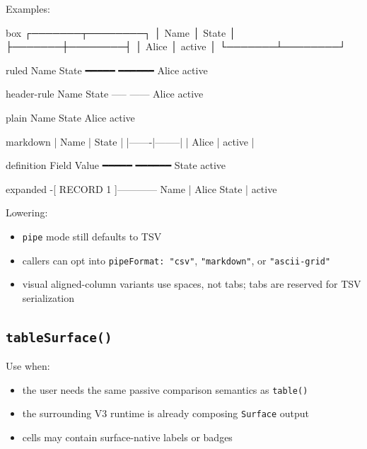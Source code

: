 Examples:

\begin{CodeBlock}
box
┌───────┬────────┐
│ Name  │ State  │
├───────┼────────┤
│ Alice │ active │
└───────┴────────┘

ruled
Name   State
━━━━━  ━━━━━━
Alice  active

header-rule
Name   State
-----  ------
Alice  active

plain
Name   State
Alice  active

markdown
| Name  | State  |
|-------|--------|
| Alice | active |

definition
Field  Value
━━━━━  ━━━━━━
State  active

expanded
-[ RECORD 1 ]------------
Name  | Alice
State | active
\end{CodeBlock}

Lowering:

\begin{itemize}
\tightlist
\item
  \texttt{p\allowbreak{}i\allowbreak{}p\allowbreak{}e} mode still defaults to TSV
\item
  callers can opt into \texttt{p\allowbreak{}i\allowbreak{}p\allowbreak{}e\allowbreak{}F\allowbreak{}o\allowbreak{}r\allowbreak{}m\allowbreak{}a\allowbreak{}t\allowbreak{}:\allowbreak{} \allowbreak{}"\allowbreak{}c\allowbreak{}s\allowbreak{}v\allowbreak{}"}, \texttt{"\allowbreak{}m\allowbreak{}a\allowbreak{}r\allowbreak{}k\allowbreak{}d\allowbreak{}o\allowbreak{}w\allowbreak{}n\allowbreak{}"}, or \texttt{"\allowbreak{}a\allowbreak{}s\allowbreak{}c\allowbreak{}i\allowbreak{}i\allowbreak{}-\allowbreak{}g\allowbreak{}r\allowbreak{}i\allowbreak{}d\allowbreak{}"}
\item
  visual aligned-column variants use spaces, not tabs; tabs are reserved for TSV serialization
\end{itemize}

\subsection{\texorpdfstring{\texttt{t\allowbreak{}a\allowbreak{}b\allowbreak{}l\allowbreak{}e\allowbreak{}S\allowbreak{}u\allowbreak{}r\allowbreak{}f\allowbreak{}a\allowbreak{}c\allowbreak{}e\allowbreak{}(\allowbreak{})}}{}}\label{record-023-tablesurface}

Use when:

\begin{itemize}
\tightlist
\item
  the user needs the same passive comparison semantics as \texttt{t\allowbreak{}a\allowbreak{}b\allowbreak{}l\allowbreak{}e\allowbreak{}(\allowbreak{})}
\item
  the surrounding V3 runtime is already composing \texttt{S\allowbreak{}u\allowbreak{}r\allowbreak{}f\allowbreak{}a\allowbreak{}c\allowbreak{}e} output
\item
  cells may contain surface-native labels or badges
\end{itemize}

